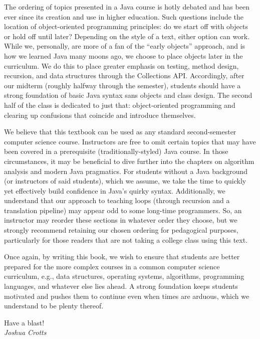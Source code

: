 The ordering of topics presented in a Java course is hotly debated and has been ever since its creation and use in higher education. Such questions include the location of object-oriented programming principles: do we start off with objects or hold off until later? Depending on the style of a text, either option can work. While we, personally, are more of a fan of the ``early objects'' approach, and is how we learned Java many moons ago, we choose to place objects later in the curriculum. We do this to place greater emphasis on testing, method design, recursion, and data structures through the Collections API. Accordingly, after our midterm (roughly halfway through the semester), students should have a strong foundation of basic Java syntax sans objects and class design. The second half of the class is dedicated to just that: object-oriented programming and clearing up confusions that coincide and introduce themselves. 

We believe that this textbook can be used as any standard second-semester computer science course. Instructors are free to omit certain topics that may have been covered in a prerequisite (traditionally-styled) Java course. In those circumstances, it may be beneficial to dive further into the chapters on algorithm analysis and modern Java pragmatics. For students without a Java background (or instructors of said students), which we assume, we take the time to quickly yet effectively build confidence in Java's quirky syntax. Additionally, we understand that our approach to teaching loops (through recursion and a translation pipeline) may appear odd to some long-time programmers. So, an instructor may reorder these sections in whatever order they choose, but we strongly recommend retaining our chosen ordering for pedagogical purposes, particularly for those readers that are not taking a college class using this text.

Once again, by writing this book, we wish to ensure that students are better prepared for the more complex courses in a common computer science curriculum, e.g., data structures, operating systems, algorithms, programming languages, and whatever else lies ahead. A strong foundation keeps students motivated and pushes them to continue even when times are arduous, which we understand to be plenty thereof.

\begin{flushright}
Have a blast!\\\textit{Joshua Crotts}
\end{flushright}